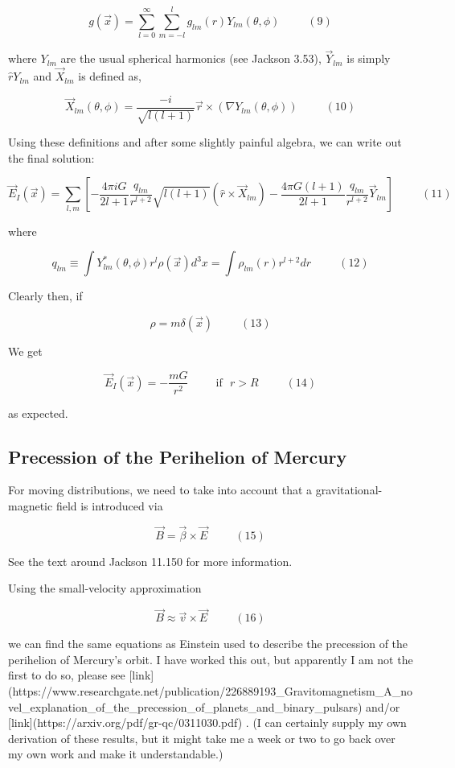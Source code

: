 \documentclass {article}
\begin{document}
$$g(\vec x) = \sum_{l=0}^{\infty} \sum_{m=-l}^{l} g_{lm}(r) Y_{lm}(\theta, \phi) ~~~~~~~~~~~ (9)$$

where $Y_{lm}$ are the usual spherical harmonics (see Jackson 3.53), $\vec Y_{lm}$ is simply $\hat r Y_{lm}$  and $\vec X_{lm}$ is defined as,

$$\vec X_{lm}(\theta, \phi) = \frac {-i}{\sqrt{l(l+1)}} \vec r \times \left( \nabla Y_{lm}(\theta, \phi) \right) ~~~~~~~~~~~ (10)$$

Using these definitions and after some slightly painful algebra, we can write out the final solution:

$$\vec E_I(\vec x) = \sum_{l,m} \left[ -\frac {4\pi i G }{2l+1} \frac {q_{lm}}{r^{l+2}} \sqrt {l(l+1)} \left(\hat r \times \vec X_{lm} \right)  - \frac {4 \pi G (l+1)}{2l+1} \frac {q_{lm}}{r^{l+2}} \vec Y_{lm} \right] ~~~~~~~~~~~ (11)$$

where

$$q_{lm} \equiv \int Y_{lm}^* (\theta, \phi) r^l \rho (\vec x ) d^3x = \int \rho_{lm} (r) r^{l+2}dr ~~~~~~~~~~~ (12)$$

Clearly then, if

$$\rho = m\delta(\vec x) ~~~~~~~~~~~ (13)$$

We get

$$\vec E_I(\vec x) = - \frac {mG} {r^2}  ~~~~~~~~~~~ \textrm{if} ~~~ r > R ~~~~~~~~~~~ (14)$$

as expected.

\subsection{Precession of the Perihelion of Mercury}

For moving distributions, we need to take into account that a gravitational-magnetic field is introduced via

$$\vec B = \vec \beta \times \vec E ~~~~~~~~~~~ (15)$$

See the text around Jackson 11.150 for more information. 

Using the small-velocity approximation 

$$\vec B \approx \vec v \times \vec E ~~~~~~~~~~~ (16)$$

we can find the same equations as Einstein used to describe the precession of the perihelion of Mercury's orbit. I have worked this out, but apparently I am not the first to do so, please see [link](https://www.researchgate.net/publication/226889193\_Gravitomagnetism\_A\_novel\_explanation\_of\_the\_precession\_of\_planets\_and\_binary\_pulsars) and/or [link](https://arxiv.org/pdf/gr-qc/0311030.pdf) . (I can certainly supply my own derivation of these results, but it might take me a week or two to go back over my own work and make it understandable.)
\end{document}
